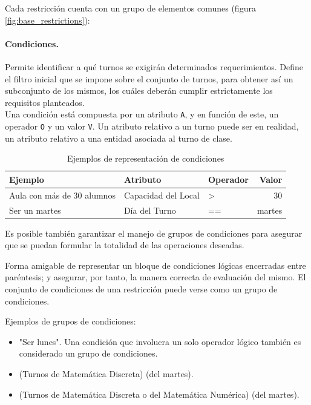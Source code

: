 Cada restricción cuenta con un grupo de elementos comunes (figura \ref{fig:base_restrictions}):\\

\paragraph{Condiciones.}
Permite identificar a qué turnos se exigirán determinados requerimientos. Define el filtro inicial que se impone sobre el conjunto de turnos, para obtener así un subconjunto de los mismos, los cuáles deberán cumplir estrictamente los requisitos planteados.\\
	
Una condición está compuesta por un atributo \texttt{A}, y en función de este, un operador \texttt{O} y un valor \texttt{V}. Un atributo relativo a un turno puede ser en realidad, un atributo relativo a una entidad asociada al turno de clase.\\

\begin{table}[h]
	\centering
	\begin{tabular}[c]{l|l|l|r}
		\textbf{Ejemplo}                   & \textbf{Atributo}     & \textbf{Operador} & \textbf{Valor} \\ 
		\hline 
		Aula con más de 30 alumnos         &  Capacidad del Local  & >                 & 30             \\ 
		Ser un martes					   & Día del Turno         & ==                & martes
	\end{tabular}
	\caption{Ejemplos de representación de condiciones}
	\label{tab:conditions}		
\end{table}

Es posible también garantizar el manejo de grupos de condiciones para asegurar que se puedan formular la totalidad de las operaciones deseadas.

\begin{dfn}
	Forma amigable de representar un bloque de condiciones lógicas encerradas entre paréntesis; y asegurar, por tanto, la manera correcta de evaluación del mismo. El conjunto de condiciones de una restricción puede verse como un grupo de condiciones.
\end{dfn}

Ejemplos de grupos de condiciones: 
\begin{itemize}
	\item "Ser lunes". Una condición que involucra un solo operador lógico también es considerado un grupo de condiciones.
	\item (Turnos de Matemática Discreta) (del martes). 
	\item (Turnos de Matemática Discreta o del Matemática Numérica) (del martes).
\end{itemize}

